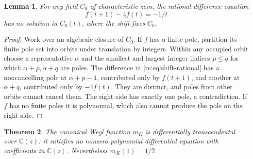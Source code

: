 \documentclass[11pt,a4paper]{article}
\newtheorem{theorem}{Theorem}[section]
\newtheorem{lemma}[theorem]{Lemma}
\theoremstyle{definition}
\theoremstyle{remark}
\theoremstyle{plain}
\numberwithin{equation}{section}
\providecommand{\rcC}{\mathbb C}
\begin{document}
\begin{lemma}\label{rc:lem:no-shift-rational}
For any field $C_0$ of characteristic zero, the rational difference
equation
\begin{equation}\label{rc:eq:shift-rational}
 f(t+1)-4f(t)=-1/t
\end{equation}
has no solution in $C_0(t)$, where the shift fixes $C_0$.
\end{lemma}

\begin{proof}
Work over an algebraic closure of $C_0$.  If $f$ has a finite pole,
partition its finite pole set into orbits under translation by integers.
Within any occupied orbit choose a representative $\alpha$ and the
smallest and largest integer indices $p\le q$ for which
$\alpha+p,\alpha+q$ are poles.  The difference in
\eqref{rc:eq:shift-rational} has a noncancelling pole at
$\alpha+p-1$, contributed only by $f(t+1)$, and another at
$\alpha+q$, contributed only by $-4f(t)$.  They are distinct, and poles
from other orbits cannot cancel them.  The right side has exactly one
pole, a contradiction.  If $f$ has no finite poles it is polynomial,
which also cannot produce the pole on the right side.
\end{proof}

\begin{theorem}\label{rc:thm:differential-transcendence}
The canonical Weyl function $m_K$ is differentially transcendental over
$\rcC(z)$: it satisfies no nonzero polynomial differential equation
with coefficients in $\rcC(z)$.  Nevertheless $m_K(1)=1/2$.
\end{theorem}
\end{document}
